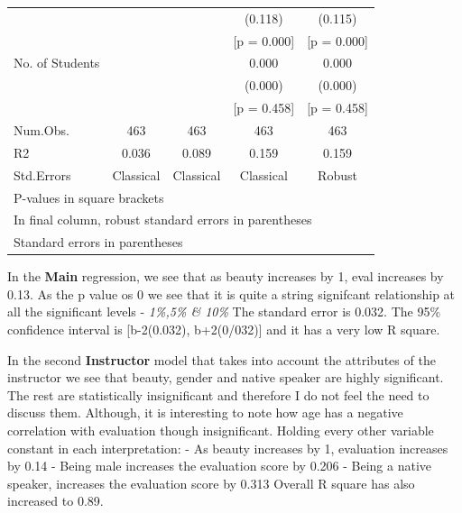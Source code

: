 \documentclass[
  12 pt,
]{article}
\begin{document}
\begin{table}
\begin{tabular}[t]{lcccc}
 &  &  & (\num{0.118}) & (\num{0.115})\\
 &  &  & {}[p = \num{0.000}] & {}[p = \num{0.000}]\\
No. of Students &  &  & \num{0.000} & \num{0.000}\\
 &  &  & (\num{0.000}) & (\num{0.000})\\
 &  &  & {}[p = \num{0.458}] & {}[p = \num{0.458}]\\
\midrule
Num.Obs. & \num{463} & \num{463} & \num{463} & \num{463}\\
R2 & \num{0.036} & \num{0.089} & \num{0.159} & \num{0.159}\\
Std.Errors & Classical & Classical & Classical & Robust\\
\bottomrule
\multicolumn{5}{l}{\rule{0pt}{1em}P-values in square brackets}\\
\multicolumn{5}{l}{\rule{0pt}{1em}In final column, robust standard errors in parentheses}\\
\multicolumn{5}{l}{\rule{0pt}{1em}Standard errors in parentheses}\\
\end{tabular}
\end{table}

In the \textbf{Main} regression, we see that as beauty increases by 1, eval increases by 0.13. As the p value os 0 we see that it is quite a string signifcant relationship at all the significant levels - \emph{1\%,5\% \& 10\%} The standard error is 0.032. The 95\% confidence interval is {[}b-2(0.032), b+2(0/032){]} and it has a very low R square.

In the second \textbf{Instructor} model that takes into account the attributes of the instructor we see that beauty, gender and native speaker are highly significant. The rest are statistically insignificant and therefore I do not feel the need to discuss them. Although, it is interesting to note how age has a negative correlation with evaluation though insignificant. Holding every other variable constant in each interpretation:
- As beauty increases by 1, evaluation increases by 0.14
- Being male increases the evaluation score by 0.206
- Being a native speaker, increases the evaluation score by 0.313
Overall R square has also increased to 0.89.
\end{document}
